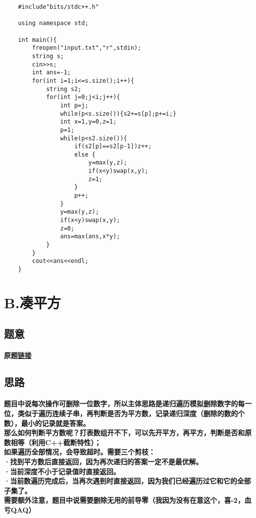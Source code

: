 \documentclass[cyan,pad,cn]{elegantnote}
\begin{document}
\begin{lstlisting}
    #include"bits/stdc++.h"
  
    using namespace std;
    
    int main(){
        freopen("input.txt","r",stdin);
        string s;
        cin>>s;
        int ans=-1;
        for(int i=1;i<=s.size();i++){
            string s2;
            for(int j=0;j<i;j++){
                int p=j;
                while(p<s.size()){s2+=s[p];p+=i;}
                int x=1,y=0,z=1;
                p=1;
                while(p<s2.size()){
                    if(s2[p]==s2[p-1])z++;
                    else {
                        y=max(y,z);
                        if(x<y)swap(x,y);
                        z=1;
                    }
                    p++;
                }
                y=max(y,z);
                if(x<y)swap(x,y);
                z=0;
                ans=max(ans,x*y);
            }
        }
        cout<<ans<<endl;
    } 
\end{lstlisting}

\section{
    B.凑平方
}

\subsection{题意}

\paragraph{原题\href{https://www.acwing.com/problem/content/3799/}{链接}} 

\subsection{思路}

\paragraph{
    题目中说每次操作可删除一位数字，所以主体思路是递归遍历模拟删除数字的每一位，类似于遍历连续子串，再判断是否为平方数，记录递归深度（删除的数的个数），最小的记录就是答案。
    \\那么如何判断平方数呢？打表数组开不下，可以先开平方，再平方，判断是否和原数相等（利用C++截断特性）；
    \\如果遍历全部情况，会导致超时。需要三个剪枝：
    \\·找到平方数后直接返回，因为再次递归的答案一定不是最优解。
    \\·当前深度不小于记录值时直接返回。
    \\·当前数遍历完成后，当再次遇到时直接返回，因为我们已经遍历过它和它的全部子集了。
    \\需要额外注意，题目中说需要删除无用的前导零（我因为没有在意这个，喜-2，血亏QAQ）
}
\end{document}
